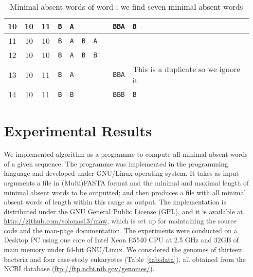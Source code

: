 \documentclass{llncs}
\begin{document}
\begin{table}
\begin{center}
{\begin{tabular}{|*{3}{c|}*{5}{c|}l|l|}
 10 & 10 & 11 &\cellcolor{Apricot}\texttt{B}&\cellcolor{Thistle}\texttt{A}& & & &\texttt{BBA} &\texttt{B}\\ \hline
 11 & 10 & 10 &\cellcolor{Apricot}\texttt{B}&\cellcolor{Apricot}\texttt{A}&\cellcolor{Apricot}\texttt{B}&\cellcolor{Thistle}\texttt{A}& & &\\ \hline
 12 & 10 & 10 &\cellcolor{Apricot}\texttt{B}&\cellcolor{Apricot}\texttt{A}&\cellcolor{Apricot}\texttt{B}&\cellcolor{Thistle}\texttt{B}& & &\\ \hline
 13 & 10 & 11 & \cellcolor{Apricot}\texttt{B}&\cellcolor{Thistle}\texttt{A}& & & &\texttt{BBA}&{This is a duplicate so we ignore it}\\ \hline
 14 & 10 & 11 &\cellcolor{Apricot}\texttt{B}&\cellcolor{Thistle}\texttt{B}& & & &\texttt{BBB}& \texttt{B}\\ \hline
\end{tabular}
}
  \end{center}
  \caption{Minimal absent words of word ; we find seven minimal absent words }
  \label{tab:maws}
\end{table}
\section{Experimental Results}
\label{sec:exp}
  We implemented algorithm  as a programme to compute all minimal absent words of a given sequence. 
  The programme was implemented in the  programming language and developed under GNU/Linux operating system. 
  It takes as input arguments a file in (Multi)FASTA format and the minimal and maximal length of minimal absent words to be outputted; and then 
  produces a file with all minimal absent words of length within this range as output.
  The implementation is distributed under the GNU General Public License (GPL), and it is available at \url{http://github.com/solonas13/maw}, which is set up for maintaining the source code and the man-page documentation.
  The experiments were conducted on a Desktop PC using one core of Intel Xeon E5540 CPU at 2.5 GHz and 32GB of main memory under 64-bit GNU/Linux.
  We considered the genomes of thirteen bacteria and four case-study eukaryotes (Table~\ref{tab:data}), all obtained from the NCBI database (\url{ftp://ftp.ncbi.nih.gov/genomes/}).
\end{document}
